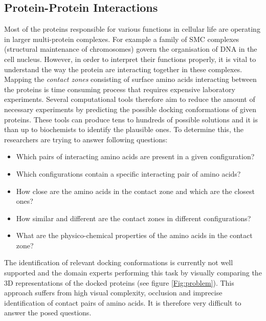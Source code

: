 \subsection{Protein-Protein Interactions}
\label{Sec:PPIproblem}
Most of the proteins responsible for various functions in cellular life are operating in larger multi-protein complexes. For example a family of SMC complexes (structural maintenance of chromosomes) govern the organisation of DNA in the cell nucleus. However, in order to interpret their functions properly, it is vital to understand the way the protein are interacting together in these complexes. Mapping the \textit{contact zones} consisting of surface amino acids interacting between the proteins is time consuming process that requires expensive laboratory experiments. Several computational tools therefore aim to reduce the amount of necessary experiments by predicting the possible docking conformations of given proteins. These tools can produce tens to hundreds of possible solutions and it is than up to biochemists to identify the plausible ones. To determine this, the researchers are trying to answer following questions:

\begin{itemize}
\setlength\itemsep{0.5pt}
\item{Which pairs of interacting amino acids are present in a given configuration?}
\item{Which configurations contain a specific interacting pair of
amino acids?}
\item{How close are the amino acids in the contact zone and which
are the closest ones?}
\item{How similar and different are the contact zones in different configurations?}
\item{What are the physico-chemical properties of the amino acids
in the contact zone?}
\end{itemize}

The identification of relevant docking conformations is currently not well supported and the domain experts performing this task by visually comparing the 3D representations of the docked proteins (see figure \ref{Fig:problem}). This approach suffers from high visual complexity, occlusion and imprecise identification of contact pairs of amino acids. It is therefore very difficult to answer the posed questions.

